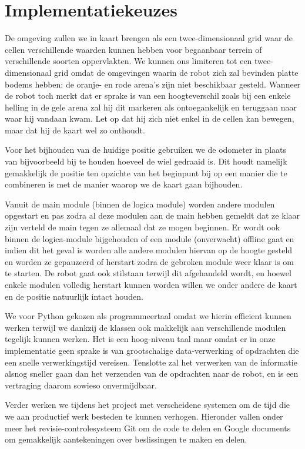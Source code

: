\documentclass[a4paper, 11pt]{article}
\begin{document}
\clearpage
\section*{Implementatiekeuzes}
  De omgeving zullen we in kaart brengen als een twee-dimensionaal grid waar de cellen verschillende waarden kunnen
  hebben voor begaanbaar terrein of verschillende soorten oppervlakten. We kunnen ons limiteren tot een twee-
  dimensionaal grid omdat de omgevingen waarin de robot zich zal bevinden platte bodems hebben: de oranje- en rode
  arena's zijn niet beschikbaar gesteld. Wanneer de robot toch merkt dat er sprake is van een hoogteverschil zoals
  bij een enkele helling in de gele arena zal hij dit markeren als ontoegankelijk en teruggaan naar waar hij 
  vandaan kwam. Let op dat hij zich niet enkel in de cellen kan bewegen, maar dat hij de kaart wel zo onthoudt.

  Voor het bijhouden van de huidige positie gebruiken we de odometer in plaats van bijvoorbeeld bij te
  houden hoeveel de wiel gedraaid is. Dit houdt namelijk gemakkelijk de positie ten opzichte van het beginpunt bij
  op een manier die te combineren is met de manier waarop we de kaart gaan bijhouden.

  Vanuit de main module (binnen de logica module) worden andere modulen opgestart en pas zodra al deze modulen
  aan de main hebben gemeldt
  dat ze klaar zijn verteld de main tegen ze allemaal dat ze mogen beginnen. Er wordt ook binnen de logica-module
  bijgehouden of een module (onverwacht) offline gaat en indien dit het geval is worden alle andere modulen hiervan
  op de hoogte gesteld en worden ze gepauzeerd of herstart zodra de gebroken module weer klaar is om te starten. De robot gaat
  ook stilstaan terwijl dit afgehandeld wordt, en hoewel enkele modulen volledig herstart kunnen worden willen we
  onder andere de kaart en de positie natuurlijk intact houden.


  We voor Python gekozen als programmeertaal omdat we hierin efficient kunnen werken terwijl we dankzij de
  klassen ook makkelijk aan verschillende modulen tegelijk kunnen werken. Het is een
  hoog-niveau taal maar omdat er in onze implementatie geen sprake is van grootschalige data-verwerking of 
  opdrachten die een snelle verwerkingstijd vereisen. Tenslotte zal het verwerken van de informatie alsnog sneller
  gaan dan het verzenden van de opdrachten naar de robot, en is een vertraging daarom sowieso onvermijdbaar.

  Verder werken we tijdens het project met verscheidene systemen om de tijd die we aan productief werk besteden
  te kunnen verhogen. Hieronder vallen onder meer het revisie-controlesysteem Git om de code te delen en Google
  documents om gemakkelijk aantekeningen over beslissingen te maken en delen.
\end{document}

